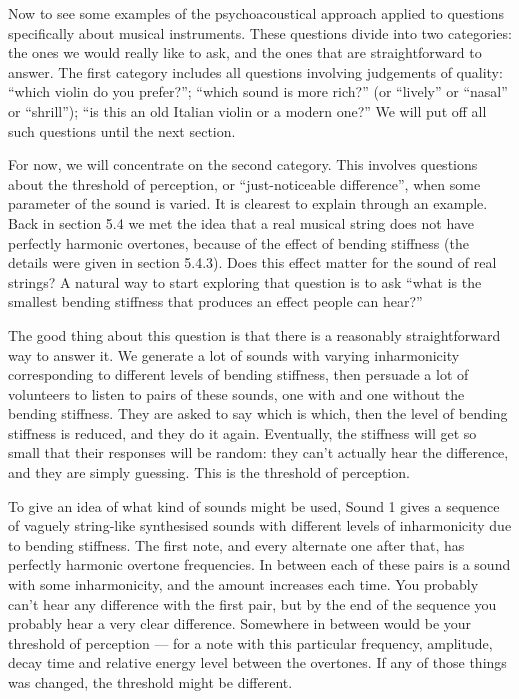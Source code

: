 

  Now to see some examples of the psychoacoustical approach applied to 
  questions specifically about musical instruments. These questions divide into 
  two categories: the ones we would really like to ask, and the ones that are 
  straightforward to answer. The first category includes all questions 
  involving judgements of quality: “which violin do you prefer?”; “which sound 
  is more rich?” (or “lively” or “nasal” or “shrill”); “is this an old Italian 
  violin or a modern one?” We will put off all such questions until the next 
  section. 

  For now, we will concentrate on the second category. This involves questions 
  about the threshold of perception, or “just-noticeable difference”, when some 
  parameter of the sound is varied. It is clearest to explain through an 
  example. Back in section 5.4 we met the idea that a real musical string does 
  not have perfectly harmonic overtones, because of the effect of bending 
  stiffness (the details were given in section 5.4.3). Does this effect matter 
  for the sound of real strings? A natural way to start exploring that question 
  is to ask “what is the smallest bending stiffness that produces an effect 
  people can hear?” 

  The good thing about this question is that there is a reasonably 
  straightforward way to answer it. We generate a lot of sounds with varying 
  inharmonicity corresponding to different levels of bending stiffness, then 
  persuade a lot of volunteers to listen to pairs of these sounds, one with and 
  one without the bending stiffness. They are asked to say which is which, then 
  the level of bending stiffness is reduced, and they do it again. Eventually, 
  the stiffness will get so small that their responses will be random: they 
  can’t actually hear the difference, and they are simply guessing. This is the 
  threshold of perception. 

  To give an idea of what kind of sounds might be used, Sound 1 gives a 
  sequence of vaguely string-like synthesised sounds with different levels of 
  inharmonicity due to bending stiffness. The first note, and every alternate 
  one after that, has perfectly harmonic overtone frequencies. In between each 
  of these pairs is a sound with some inharmonicity, and the amount increases 
  each time. You probably can’t hear any difference with the first pair, but by 
  the end of the sequence you probably hear a very clear difference. Somewhere 
  in between would be your threshold of perception — for a note with this 
  particular frequency, amplitude, decay time and relative energy level between 
  the overtones. If any of those things was changed, the threshold might be 
  different. 


